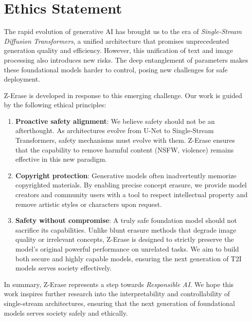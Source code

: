 \section{Ethics Statement}

The rapid evolution of generative AI has brought us to the era of \emph{Single-Stream Diffusion Transformers}, a unified architecture that promises unprecedented generation quality and efficiency. However, this unification of text and image processing also introduces new risks. The deep entanglement of parameters makes these foundational models harder to control, posing new challenges for safe deployment.

Z-Erase is developed in response to this emerging challenge. Our work is guided by the following ethical principles:
\begin{enumerate}[leftmargin=*]
    \item \textbf{Proactive safety alignment}: We believe safety should not be an afterthought. As architectures evolve from U-Net to Single-Stream Transformers, safety mechanisms must evolve with them. Z-Erase ensures that the capability to remove harmful content (NSFW, violence) remains effective in this new paradigm.
    \item \textbf{Copyright protection}: Generative models often inadvertently memorize copyrighted materials. By enabling precise concept erasure, we provide model creators and community users with a tool to respect intellectual property and remove artistic styles or characters upon request.
    \item \textbf{Safety without compromise}: A truly safe foundation model should not sacrifice its capabilities. Unlike blunt erasure methods that degrade image quality or irrelevant concepts, Z-Erase is designed to strictly preserve the model's original powerful performance on unrelated tasks. We aim to build both secure and highly capable models, ensuring the next generation of T2I models serves society effectively.
\end{enumerate}

In summary, Z-Erase represents a step towards \emph{Responsible AI}. We hope this work inspires further research into the interpretability and controllability of single-stream architectures, ensuring that the next generation of foundational models serves society safely and ethically.